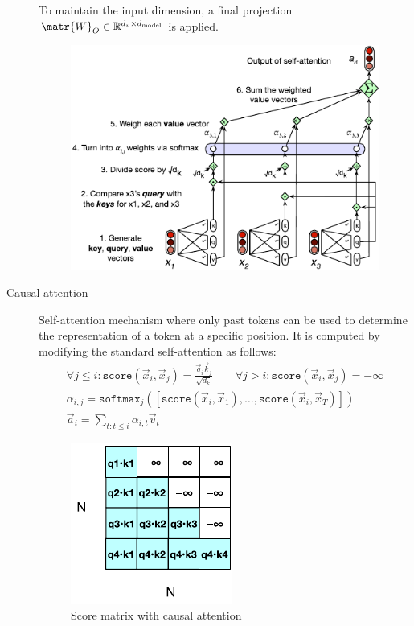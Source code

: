 \begin{description}
        To maintain the input dimension, a final projection $\matr{W}_O \in \mathbb{R}^{d_v \times d_\text{model}}$ is applied.

        \begin{figure}[H]
            \centering
            \includegraphics[width=0.6\linewidth]{./img/_self_attention.pdf}
        \end{figure}


    \item[Causal attention] 
        Self-attention mechanism where only past tokens can be used to determine the representation of a token at a specific position. It is computed by modifying the standard self-attention as follows:
        \[
            \begin{gathered}
                \forall j \leq i: \texttt{score}(\vec{x}_i, \vec{x}_j) = \frac{\vec{q}_i \vec{k}_j}{\sqrt{d_k}} \qquad
                \forall j > i: \texttt{score}(\vec{x}_i, \vec{x}_j) = -\infty \\
                \alpha_{i,j} = \texttt{softmax}_j\left( \left[\texttt{score}(\vec{x}_i, \vec{x}_1), \dots, \texttt{score}(\vec{x}_i, \vec{x}_T)\right] \right) \\
                \vec{a}_i = \sum_{t: t \leq i} \alpha_{i,t} \vec{v}_t
            \end{gathered}
        \]

        \begin{figure}[H]
            \centering
            \includegraphics[width=0.2\linewidth]{./img/_masked_attention.pdf}
            \caption{Score matrix with causal attention}
        \end{figure}
\end{description}


